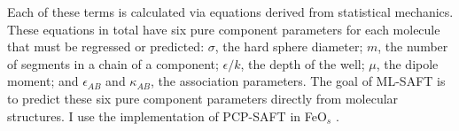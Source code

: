 Each of these terms is calculated via equations derived from statistical mechanics. These equations in total have six pure component parameters for each molecule that must be regressed or predicted: $\sigma$, the hard sphere diameter; $m$, the number of segments in a chain of a component; $\epsilon/k$, the depth of the well; $\mu$, the dipole moment; and $\epsilon_{AB}$ and $\kappa_{AB}$, the association parameters. The goal of ML-SAFT is to predict these six pure component parameters directly from molecular structures. I use the implementation of PCP-SAFT in FeO$_{s}$ \cite{Rehner2023}.




